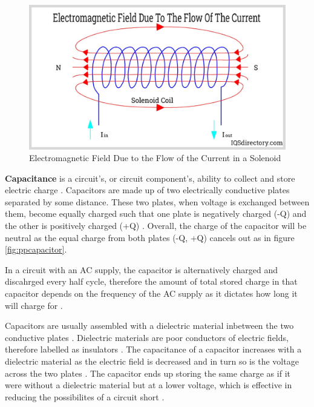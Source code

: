 \documentclass[12pt]{article}
\begin{document}
\begin{figure}[ht]
    \includegraphics[width=15cm]{solenoid.jpg}
    \centering
    \caption{\centering Electromagnetic Field Due to the Flow of the Current in a Solenoid \cite{solenoidpic}}
    \label{fig:solenoid}
\end{figure}

\textbf{Capacitance} is a circuit's, or circuit component's, ability to collect and store electric charge
\cite{flukecapacitance}.
Capacitors are made up of two electrically conductive plates separated by some distance. These two plates, when voltage is exchanged between them,
become equally charged such that one plate is negatively charged (-Q) and the other is positively charged (+Q)
\cite{britcapacitance,librecapacitance}.
Overall, the charge of the capacitor will be neutral as the equal charge from both plates (-Q, +Q) cancels out
\cite{librecapacitance} as in figure \ref{fig:ppcapacitor}.

In a circuit with an AC supply, the capacitor is alternatively charged and discahrged every half cycle, therefore the amount of total
stored charge in that capacitor depends on the frequency of the AC supply as it dictates how long it will charge for
\cite{britcapacitance}.

Capacitors are usually assembled with a dielectric material inbetween the two conductive plates
\cite{britcapacitance,flukecapacitance,librecapacitance}.
Dielectric materials are poor conductors of electric fields, therefore labelled as insulators 
\cite{britdielectric}.
The capacitance of a capacitor increases with a dielectric material as the electric field is decreased and in turn so is the voltage across the two plates
\cite{hyperdielectric}.
The capacitor ends up storing the same charge as if it were without a dielectric material but at a lower voltage, which is effective in reducing the possibilites of a circuit short
\cite{hyperdielectric}.
\end{document}
